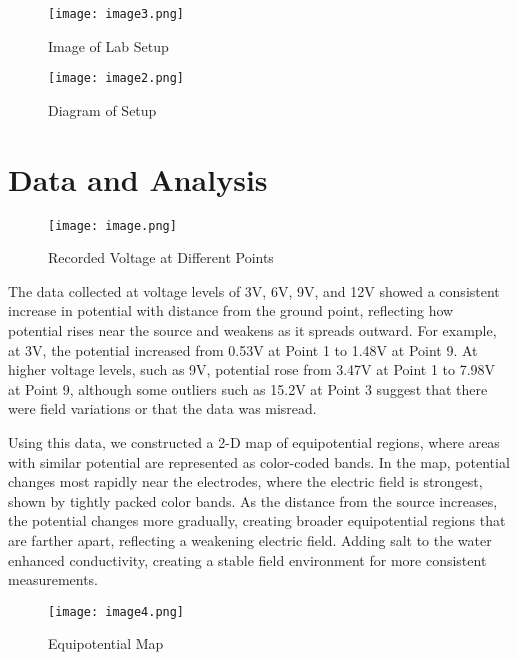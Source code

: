 \documentclass[conference]{IEEEtran}
\begin{document}
\begin{figure}[ht]
\centering
\begin{minipage}{0.50\columnwidth}
    \texttt{[image: image3.png]}
    \caption{Image of Lab Setup}
    \label{fig:setup}
\end{minipage}\hfill
\begin{minipage}{0.50\columnwidth}
    \texttt{[image: image2.png]}
    \caption{Diagram of Setup}
    \label{fig:diagram}
\end{minipage}
\end{figure}



\section{Data and Analysis}

\begin{figure}[H]
    \centering
    \texttt{[image: image.png]}
    \caption{Recorded Voltage at Different Points}
    \label{fig:voltage_data}
\end{figure}

The data collected at voltage levels of 3V, 6V, 9V, and 12V showed a consistent increase in potential with distance from the ground point, reflecting how potential rises near the source and weakens as it spreads outward. For example, at 3V, the potential increased from 0.53V at Point 1 to 1.48V at Point 9. At higher voltage levels, such as 9V, potential rose from 3.47V at Point 1 to 7.98V at Point 9, although some outliers such as 15.2V at Point 3 suggest that there were field variations or that the data was misread.

Using this data, we constructed a 2-D map of equipotential regions, where areas with similar potential are represented as color-coded bands. In the map, potential changes most rapidly near the electrodes, where the electric field is strongest, shown by tightly packed color bands. As the distance from the source increases, the potential changes more gradually, creating broader equipotential regions that are farther apart, reflecting a weakening electric field. Adding salt to the water enhanced conductivity, creating a stable field environment for more consistent measurements. 

\begin{figure}[ht]
    \centering
    \texttt{[image: image4.png]}
    \caption{Equipotential Map}
    \label{fig:equipotential_map}
\end{figure}
\end{document}
